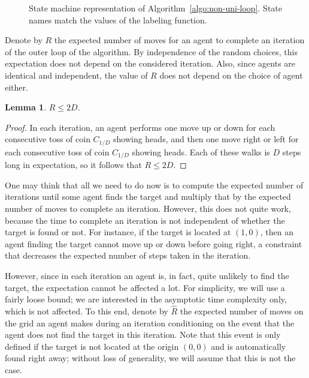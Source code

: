 \documentclass[11pt]{article}
\newtheorem{lemma}[theorem]{Lemma}
\begin{document}
\begin{figure}[t]
\begin{minipage}{\textwidth}
\begin{minipage}{.40\textwidth}
\begin{center}
{
}

State machine representation of Algorithm~\ref{algo:non-uni-loop}. State names match the values of the labeling function.

\end{center}
\end{minipage}
%
 \end{minipage}
\end{figure}


Denote by $R$ the expected number of moves for an agent to complete an iteration of the outer loop of the algorithm. By independence of the random choices, this expectation does not depend on the considered iteration. Also, since agents are identical and independent, the value of $R$ does not depend on the choice of agent either.
\begin{lemma}
\label{lem:exp_D}
$R \leq 2D$.
\end{lemma}
\begin{proof}
In each iteration, an agent performs one move up or down for each consecutive toss of coin $C_{1/D}$ showing heads, and then one move right or left for each consecutive toss of coin $C_{1/D}$ showing heads. Each of these walks is $D$ steps long in expectation, so it follows that $R \leq 2D$.
\end{proof}

One may think that all we need to do now is to compute the expected number of iterations until some agent finds the target and multiply that by the expected number of moves to complete an iteration. However, this does not quite work, because the time to complete an iteration is not independent of whether the target is found or not. For instance, if the target is located at $(1,0)$, then an agent finding the target cannot move up or down before going right, a constraint that decreases the expected number of steps taken in the iteration. 


However, since in each iteration an agent is, in fact, quite unlikely to find the target, the expectation cannot be affected a lot. For simplicity, we will use a fairly loose bound; we are interested in the asymptotic time complexity only, which is not affected. To this end, denote by $\hat{R}$ the expected number of moves on the grid an agent makes during an iteration conditioning on the event that the agent does not find the target in this iteration. Note that this event is only defined if the target is not located at the origin $(0,0)$ and is automatically found right away; without loss of generality, we will assume that this is not the case.
\end{document}
